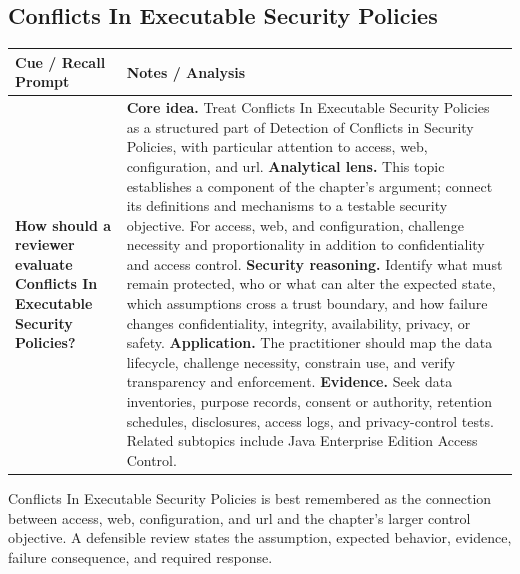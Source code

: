 \documentclass[11pt]{article}
\newcommand{\CornellHeader}{%
\rowcolor{Navy}\color{white}\bfseries Cue / Recall Prompt & \color{white}\bfseries Notes / Analysis\\\hline}
\newcommand{\CornellRow}[2]{%
\cellcolor{CueGray}\RaggedRight\textbf{#1} & \RaggedRight #2\\\hline}
\begin{document}
\subsection*{Conflicts In Executable Security Policies}
\begin{longtable}{>{\RaggedRight\arraybackslash}p{}|>{\RaggedRight\arraybackslash}p{}}
\CornellHeader
\CornellRow{How should a reviewer evaluate Conflicts In Executable Security Policies?}{\textbf{Core idea.} Treat Conflicts In Executable Security Policies as a structured part of Detection of Conflicts in Security Policies, with particular attention to access, web, configuration, and url. \textbf{Analytical lens.} This topic establishes a component of the chapter's argument; connect its definitions and mechanisms to a testable security objective. For access, web, and configuration, challenge necessity and proportionality in addition to confidentiality and access control. \textbf{Security reasoning.} Identify what must remain protected, who or what can alter the expected state, which assumptions cross a trust boundary, and how failure changes confidentiality, integrity, availability, privacy, or safety. \textbf{Application.} The practitioner should map the data lifecycle, challenge necessity, constrain use, and verify transparency and enforcement. \textbf{Evidence.} Seek data inventories, purpose records, consent or authority, retention schedules, disclosures, access logs, and privacy-control tests. Related subtopics include Java Enterprise Edition Access Control.}
\end{longtable}
\begin{topicsummary}
Conflicts In Executable Security Policies is best remembered as the connection between access, web, configuration, and url and the chapter's larger control objective. A defensible review states the assumption, expected behavior, evidence, failure consequence, and required response.
\end{topicsummary}
\end{document}
